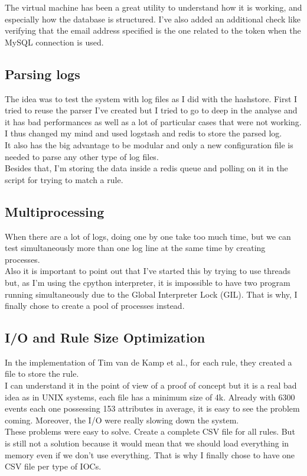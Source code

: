 \documentclass{eplmastersthesis}
\begin{document}
The virtual machine has been a great utility to understand how it is working, and especially how the database is structured. I've also added an additional check like verifying that the email address specified is the one related to the token when the MySQL connection is used.

\subsection{Parsing logs}
The idea was to test the system with log files as I did with the hashstore. First I tried to reuse the parser I've created but I tried to go to deep in the analyse and it has bad performances as well as a lot of particular cases that were not working.\\
I thus changed my mind and used logstash and redis to store the parsed log. \\
It also has the big advantage to be modular and only a new configuration file is needed to parse any other type of log files.\\
Besides that, I'm storing the data inside a redis queue and polling on it in the script for trying to match a rule. \\

\subsection{Multiprocessing}
When there are a lot of logs, doing one by one take too much time, but we can test simultaneously more than one log line at the same time by creating processes.\\
Also it is important to point out that I've started this by trying to use threads but, as I'm using the cpython interpreter, it is impossible to have two program running simultaneously due to the Global Interpreter Lock (GIL). That is why, I finally chose to create a pool of processes instead.

\subsection{I/O and Rule Size Optimization}
In the implementation of Tim van de Kamp et al., for each rule, they created a file to store the rule. \\
I can understand it in the point of view of a proof of concept but it is a real bad idea as in UNIX systems, each file has a minimum size of 4k. Already with 6300 events each one possessing 153 attributes in average, it is easy to see the problem coming. Moreover, the I/O were really slowing down the system. \\
These problems were easy to solve. Create a complete CSV file for all rules. But is still not a solution because it would mean that we should load everything in memory even if we don't use everything. That is why I finally chose to have one CSV file per type of IOCs.
\end{document}
